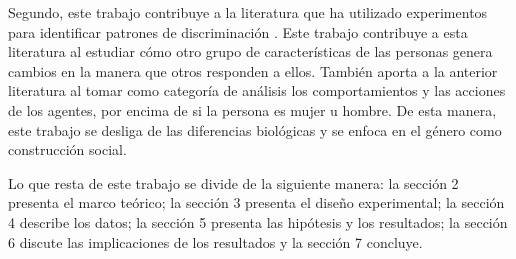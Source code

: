 Segundo, este trabajo contribuye a la literatura que ha utilizado experimentos para identificar patrones de discriminación \citep{cardenas2008discrimination, beautifulorwhite2012, howyoulookorspeak, mobius2006whybeautymatters, hoffdiscriminationsocialidentity}. Este trabajo contribuye a esta literatura al estudiar cómo otro grupo de características de las personas genera cambios en la manera que otros responden a ellos. También aporta a la anterior literatura al tomar como categoría de análisis los comportamientos y las acciones de los agentes, por encima de si la persona es mujer u hombre. De esta manera, este trabajo se desliga de las diferencias biológicas y se enfoca en el género como construcción social.

Lo que resta de este trabajo se divide de la siguiente manera: la sección 2 presenta el marco teórico; la sección 3 presenta el diseño experimental; la sección 4 describe los datos; la sección 5 presenta las hipótesis y los resultados; la sección 6 discute las implicaciones de los resultados y la sección 7 concluye. 

